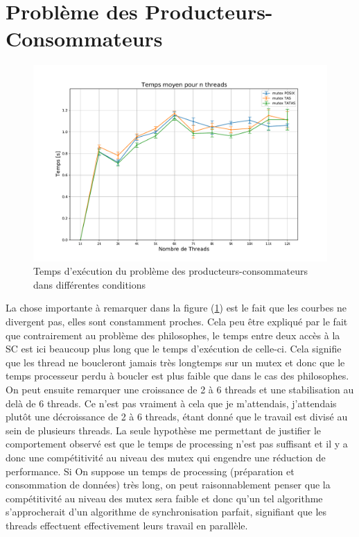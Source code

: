 \section{Problème des Producteurs-Consommateurs}

\begin{figure}[h]
    \centering
    \includegraphics[scale=0.45]{img/prodcons.pdf}
    \caption{Temps d'exécution du problème des producteurs-consommateurs dans différentes conditions}
    \label{pic:prodcons}
\end{figure}

\noindent La chose importante à remarquer dans la figure (\ref{pic:prodcons}) est le fait que les courbes ne divergent pas, elles sont constamment proches. Cela peu être expliqué par le fait que contrairement au problème des philosophes, le temps entre deux accès à la SC est ici beaucoup plus long que le temps d'exécution de celle-ci. Cela signifie que les thread ne boucleront jamais très longtemps sur un mutex et donc que le temps processeur perdu à boucler est plus faible que dans le cas des philosophes.\\

\noindent On peut ensuite remarquer une croissance de 2 à 6 threads et une stabilisation au delà de 6 threads. Ce n'est pas vraiment à cela que je m'attendais, j'attendais plutôt une décroissance de 2 à 6 threads, étant donné que le travail est divisé au sein de plusieurs threads. La seule hypothèse me permettant de justifier le comportement observé est que le temps de processing n'est pas suffisant et il y a donc une compétitivité au niveau des mutex qui engendre une réduction de performance. Si On suppose un temps de processing (préparation et consommation de données) très long, on peut raisonnablement penser que la compétitivité au niveau des mutex sera faible et donc qu'un tel algorithme s'approcherait d'un algorithme de synchronisation parfait, signifiant que les threads effectuent effectivement leurs travail en parallèle. \\

